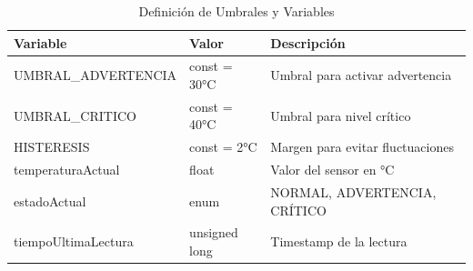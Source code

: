 

\begin{table}[!ht]
\centering
\caption{Definición de Umbrales y Variables}
\label{tab:Tabla_1_R2}
\footnotesize
\setlength{\tabcolsep}{3pt}
\renewcommand{\arraystretch}{1.3}
    \begin{tabularx}{\columnwidth}{|p{3.2cm}|p{2cm}|X|}

        \hline
        \textbf{Variable} & \textbf{Valor} & \textbf{Descripción} \\ 

        \hline UMBRAL\_ADVERTENCIA & const = 30°C & Umbral para activar advertencia \\ 

        \hline UMBRAL\_CRITICO & const = 40°C & Umbral para nivel crítico \\ 

        \hline HISTERESIS & const = 2°C & Margen para evitar fluctuaciones \\ 

        \hline temperaturaActual & float & Valor del sensor en °C \\ 

        \hline estadoActual & enum & NORMAL, ADVERTENCIA, CRÍTICO \\ 
    
        \hline tiempoUltimaLectura & unsigned long & Timestamp de la lectura \\ 
        
        \hline
    \end{tabularx}
\end{table}